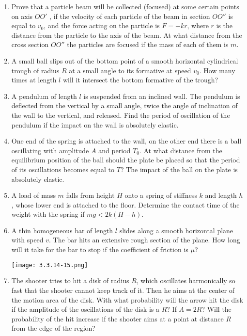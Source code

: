 \documentclass{article}
\begin{document}
\begin{enumerate}[label=3.3.\arabic*]
\item Prove that a particle beam will be collected (focused) at some certain points on axis $OO'$ , if the velocity of each particle of the beam in section $OO''$ is equal to $v_0$, and the force acting on the particle is $F = - k r$, where $r$ is the distance from the particle to the axis of the beam. At what distance from the cross section $OO''$ the particles are focused if the mass of each of them is $m$.

\item A small ball slips out of the bottom point of a smooth horizontal cylindrical trough of radius $R$ at a small angle to its formative at speed $v_0$. How many times at length $l$ will it intersect the bottom formative of the trough?

\item A pendulum of length $l$ is suspended from an inclined wall. The pendulum is deflected from the vertical by a small angle, twice the angle of inclination of the wall to the vertical, and released. Find the period of oscillation of the pendulum if the impact on the wall is absolutely elastic.

\item One end of the spring is attached to the wall, on the other end there is a ball oscillating with amplitude $A$ and period $T_0$. At what distance from the equilibrium position of the ball should the plate be placed so that the period of its oscillations becomes equal to $T$? The impact of the ball on the plate is absolutely elastic.

\item A load of mass $m$ falls from height $H$ onto a spring of stiffness $k$ and length $h$, whose lower end is attached to the floor. Determine the contact time of the weight with the spring if $m g < 2 k (H - h)$.

\item A thin homogeneous bar of length $l$ slides along a smooth horizontal plane with speed $v$. The bar hits an extensive rough section of the plane. How long will it take for the bar to stop if the coefficient of friction is $\mu$?

\begin{center}
    \texttt{[image: 3.3.14-15.png]}
\end{center}

\item The shooter tries to hit a disk of radius $R$, which oscillates harmonically so fast that the shooter cannot keep track of it. Then he aims at the center of the motion area of the disk. With what probability will the arrow hit the disk if the amplitude of the oscillations of the disk is a $R$? If $A = 2R$? Will the probability of the hit increase if the shooter aims at a point at distance $R$ from the edge of the region?


\end{enumerate}
\end{document}
